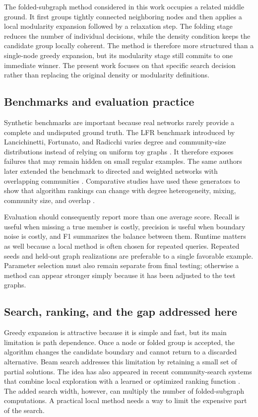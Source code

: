 \documentclass[10pt,journal,compsoc]{IEEEtran}
\begin{document}
The folded-subgraph method considered in this work occupies a related middle
ground. It first groups tightly connected neighboring nodes and then applies a
local modularity expansion followed by a relaxation step. The folding stage
reduces the number of individual decisions, while the density condition keeps
the candidate group locally coherent. The method is therefore more structured
than a single-node greedy expansion, but its modularity stage still commits
to one immediate winner. The present work focuses on that specific search
decision rather than replacing the original density or modularity definitions.

\subsection{Benchmarks and evaluation practice}
Synthetic benchmarks are important because real networks rarely provide a
complete and undisputed ground truth. The LFR benchmark introduced by
Lancichinetti, Fortunato, and Radicchi varies degree and community-size
distributions instead of relying on uniform toy graphs \cite{lfr2008}. It
therefore exposes failures that may remain hidden on small regular examples.
The same authors later extended the benchmark to directed and weighted
networks with overlapping communities \cite{lfr2009}. Comparative studies
have used these generators to show that algorithm rankings can change with
degree heterogeneity, mixing, community size, and overlap
\cite{lfrcomparative}.

Evaluation should consequently report more than one average score. Recall is
useful when missing a true member is costly, precision is useful when boundary
noise is costly, and F1 summarizes the balance between them. Runtime matters
as well because a local method is often chosen for repeated queries. Repeated
seeds and held-out graph realizations are preferable to a single favorable
example. Parameter selection must also remain separate from final testing;
otherwise a method can appear stronger simply because it has been adjusted to
the test graphs.

\subsection{Search, ranking, and the gap addressed here}
Greedy expansion is attractive because it is simple and fast, but its main
limitation is path dependence. Once a node or folded group is accepted, the
algorithm changes the candidate boundary and cannot return to a discarded
alternative. Beam search addresses this limitation by retaining a small set
of partial solutions. The idea has also appeared in recent community-search
systems that combine local exploration with a learned or optimized ranking
function \cite{communityaf}. The added search width, however, can multiply
the number of folded-subgraph computations. A practical local method needs a
way to limit the expensive part of the search.
\end{document}
